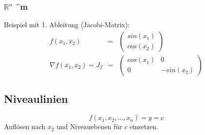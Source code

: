 \subsubsection{$\mathbb{R}^n$ \rightarrow {}^m}
\label{ssub:r_rightarrow_r}
Beispiel mit 1. Ableitung (Jacobi-Matrix): 
\begin{eqnarray*}
	f(x_1,x_2) &=& \left(\begin{array}{c} sin(x_1) \\ cos(x_2)\end{array}\right) \\
	\nabla f(x_1,x_2) = J_f &=& \left( \begin{array}{cc} cos(x_1) & 0 \\ 0 & -sin(x_2) \end{array} \right)
\end{eqnarray*}	

\subsection{Niveaulinien} %
\label{sub:niveaulinien}

\begin{equation}
	f(x_1,x_2,...,x_n) = y = c
\end{equation}
Auflösen nach $x_2$ und Niveauebenen für $c$ einsetzen.


